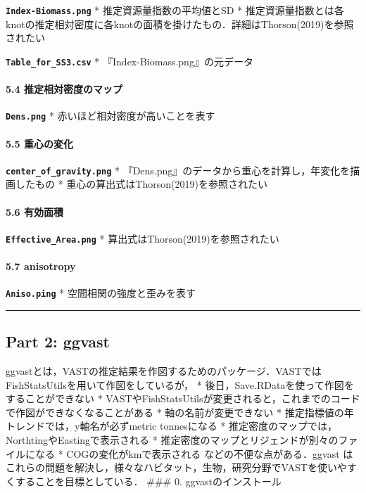 \documentclass[]{article}
\let\oldparagraph\paragraph
\renewcommand{\paragraph}[1]{\oldparagraph{#1}\mbox{}}
\begin{document}
\textbf{\texttt{Index-Biomass.png}} * 推定資源量指数の平均値とSD *
推定資源量指数とは各knotの推定相対密度に各knotの面積を掛けたもの．詳細はThorson(2019)を参照されたい

\textbf{\texttt{Table\_for\_SS3.csv}} * 『Index-Biomass.png』の元データ

\hypertarget{ux63a8ux5b9aux76f8ux5bfeux5bc6ux5ea6ux306eux30deux30c3ux30d7}{%
\paragraph{5.4
推定相対密度のマップ}\label{ux63a8ux5b9aux76f8ux5bfeux5bc6ux5ea6ux306eux30deux30c3ux30d7}}

\textbf{\texttt{Dens.png}} * 赤いほど相対密度が高いことを表す

\hypertarget{ux91cdux5fc3ux306eux5909ux5316}{%
\paragraph{5.5 重心の変化}\label{ux91cdux5fc3ux306eux5909ux5316}}

\textbf{\texttt{center\_of\_gravity.png}} *
『Dens.png』のデータから重心を計算し，年変化を描画したもの *
重心の算出式はThorson(2019)を参照されたい

\hypertarget{ux6709ux52b9ux9762ux7a4d}{%
\paragraph{5.6 有効面積}\label{ux6709ux52b9ux9762ux7a4d}}

\textbf{\texttt{Effective\_Area.png}} *
算出式はThorson(2019)を参照されたい

\hypertarget{anisotropy}{%
\paragraph{5.7 anisotropy}\label{anisotropy}}

\textbf{\texttt{Aniso.ping}} * 空間相関の強度と歪みを表す

\begin{center}\rule{0.5\linewidth}{\linethickness}\end{center}

\hypertarget{part-2-ggvast}{%
\subsection{Part 2: ggvast}\label{part-2-ggvast}}

ggvastとは，VASTの推定結果を作図するためのパッケージ．VASTではFishStatsUtilsを用いて作図をしているが，
* 後日，Save.RDataを使って作図をすることができない *
VASTやFishStatsUtilsが変更されると，これまでのコードで作図ができなくなることがある
* 軸の名前が変更できない * 推定指標値の年トレンドでは，y軸名が必ずmetric
tonnesになる * 推定密度のマップでは，NorthtingやEastingで表示される *
推定密度のマップとリジェンドが別々のファイルになる *
COGの変化がkmで表示される などの不便な点がある．ggvast
はこれらの問題を解決し，様々なハビタット，生物，研究分野でVASTを使いやすくすることを目標としている．
\#\#\# 0. ggvastのインストール
\end{document}
